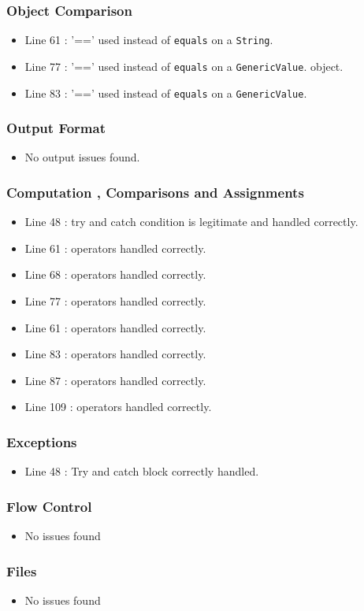 
\subsubsection{Object Comparison}
\begin{itemize}
\item Line 61 : '==' used instead of \texttt{equals} on a \texttt{String}.
\item Line 77 : '==' used instead of \texttt{equals} on a \texttt{GenericValue}. object.
\item Line 83 : '==' used instead of \texttt{equals} on a \texttt{GenericValue}.
\end{itemize}
\subsubsection{Output Format}
\begin{itemize}
\item No output issues found.
\end{itemize}
\subsubsection{Computation , Comparisons and Assignments}
\begin{itemize}
\item Line 48 : try and catch condition is legitimate and handled correctly.
\item Line 61 : operators handled correctly.
\item Line 68 : operators handled correctly.
\item Line 77 : operators handled correctly.
\item Line 61 : operators handled correctly.
\item Line 83 : operators handled correctly.
\item Line 87 : operators handled correctly.
\item Line 109 : operators handled correctly.
\end{itemize}
\subsubsection{Exceptions}
\begin{itemize}
\item Line 48 : Try and catch block correctly handled.
\end{itemize}
\subsubsection{Flow Control}
\begin{itemize}
\item No issues found
\end{itemize}
\subsubsection{Files}
\begin{itemize}
\item No issues found
\end{itemize}
